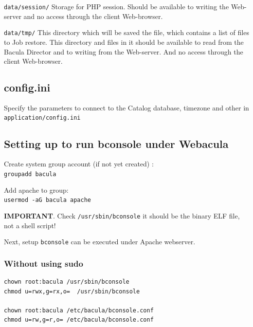 \documentclass[10pt]{article}
\begin{document}
\texttt{data/session/}   Storage for PHP session. Should be available to writing the Web-server and
                  no access through the client Web-browser.

\texttt{data/tmp/}   This directory which will be saved the file, which contains a list of files to Job restore.
                  This directory and files in it should be available to read from the Bacula Director and
                  to writing from the Web-server. And no access through the client Web-browser.




\subsection{config.ini}
\label{Install:config.ini}

Specify the parameters to connect to the Catalog database, timezone and other in \texttt{application/config.ini}




\subsection{Setting up to run bconsole under Webacula}
\label{Install:Setting up to run bconsole under Webacula}

Create system group account (if not yet created) : \\
\texttt{groupadd bacula}

Add apache to group: \\
\texttt{usermod -aG bacula apache}

\textbf{IMPORTANT}. Check \texttt{/usr/sbin/bconsole} it should be the binary ELF file, not a shell script!

Next, setup \texttt{bconsole} can be executed under Apache webserver.



\subsubsection{Without using sudo}
\label{Install:Setting up to run bconsole from under Webacula:without sudo}

\begin{verbatim}
chown root:bacula /usr/sbin/bconsole
chmod u=rwx,g=rx,o=  /usr/sbin/bconsole

chown root:bacula /etc/bacula/bconsole.conf
chmod u=rw,g=r,o= /etc/bacula/bconsole.conf
\end{verbatim}
\end{document}
